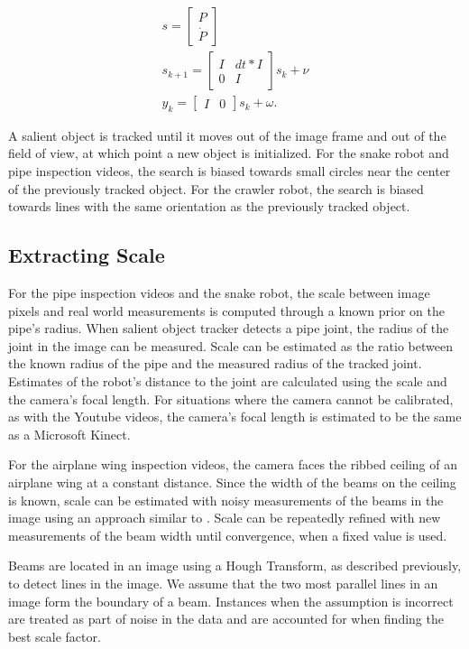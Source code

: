 \documentclass[letterpaper, 10 pt, conference]{ieeeconf}
\begin{document}
\begin{eqnarray*}
s = \begin{bmatrix} P \\ \dot{P} \end{bmatrix} \\
s_{k+1} = \begin{bmatrix} I & dt*I \\ 0 & I \end{bmatrix} s_{k} + \nu \\
y_k = \begin{bmatrix} I & 0 \end{bmatrix} s_k + \omega.
\end{eqnarray*}

A salient object is tracked until it moves out of the image frame and out of the field of view, at which point a new object is initialized. For the snake robot and pipe inspection videos, the search is biased towards small circles near the center of the previously tracked object. For the crawler robot, the search is biased towards lines with the same orientation as the previously tracked object.

\subsection{Extracting Scale}

For the pipe inspection videos and the snake robot, the scale between image pixels and real world measurements is computed through a known prior on the pipe's radius. When salient object tracker detects a pipe joint, the radius of the joint in the image can be measured. Scale can be estimated as the ratio between the known radius of the pipe and the measured radius of the tracked joint. Estimates of the robot's distance to the joint are calculated using the scale and the camera's focal length. For situations where the camera cannot be calibrated, as with the Youtube videos, the camera's focal length is estimated to be the same as a Microsoft Kinect.

For the airplane wing inspection videos, the camera faces the ribbed ceiling of an airplane wing at a constant distance. Since the width of the beams on the ceiling is known, scale can be estimated with noisy measurements of the beams in the image using an approach similar to \cite{Lucey14}. Scale can be repeatedly refined with new measurements of the beam width until convergence, when a fixed value is used.

Beams are located in an image using a Hough Transform, as described previously, to detect lines in the image. We assume that the two most parallel lines in an image form the boundary of a beam. Instances when the assumption is incorrect are treated as part of noise in the data and are accounted for when finding the best scale factor.
\end{document}
